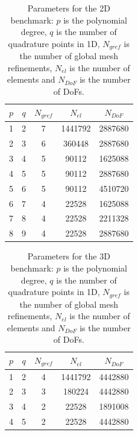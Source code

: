 \documentclass[times,doublespace]{nmeauth}
\begin{document}
\begin{table}
  \centering
  \begin{tabular}{ccccc}
  \hline
    $p$ & $q$ & $N_{gref}$ & $N_{el}$ & $N_{DoF}$ \\
  \hline
    1 & 2 & 7 & 1441792 & 2887680 \\
    2 & 3 & 6 & 360448 & 2887680 \\
    3 & 4 & 5 & 90112 & 1625088 \\
    4 & 5 & 5 & 90112 & 2887680 \\
    5 & 6 & 5 & 90112 & 4510720 \\
    6 & 7 & 4 & 22528 & 1625088 \\
    7 & 8 & 4 & 22528 & 2211328 \\
    8 & 9 & 4 & 22528 & 2887680 \\
  \hline
  \end{tabular}
  \caption{Parameters for the 2D benchmark: $p$ is the polynomial degree,
  $q$ is the {\color{red}number of quadrature points in 1D}, $N_{gref}$ is the number of global mesh refinements, $N_{el}$ is the number of elements and $N_{DoF}$ is the number of DoFs.
  }
  \label{tab:input_parameters_2d}
\end{table}

\begin{table}
  \centering
  \begin{tabular}{ccccc}
  \hline
    $p$ & $q$ & $N_{gref}$ & $N_{el}$ & $N_{DoF}$ \\
  \hline
    1 & 2 & 4 & 1441792 & 4442880 \\
    2 & 3 & 3 & 180224 & 4442880 \\
    3 & 4 & 2 & 22528 & 1891008 \\
    4 & 5 & 2 & 22528 & 4442880 \\
  \hline
  \end{tabular}
  \caption{Parameters for the 3D benchmark: $p$ is the polynomial degree,
  $q$ is the {\color{red}number of quadrature points in 1D}, $N_{gref}$ is the number of global mesh refinements, $N_{el}$ is the number of elements and $N_{DoF}$ is the number of DoFs.
  }
  \label{tab:input_parameters_3d}
\end{table}
\end{document}
